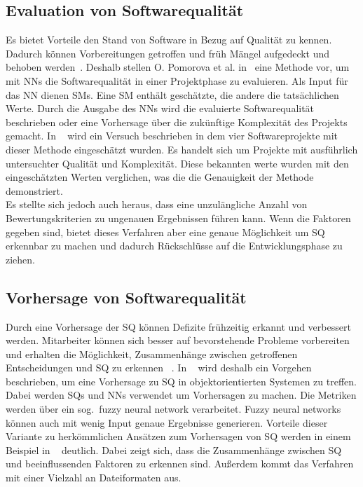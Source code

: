 \subsection{Evaluation von Softwarequalität}
Es bietet Vorteile den Stand von Software in Bezug auf Qualität zu kennen. Dadurch können Vorbereitungen getroffen und früh Mängel aufgedeckt und behoben werden~\cite{Pomorova2013}. Deshalb stellen O. Pomorova et al. in~\cite{Pomorova2013} eine Methode vor, um mit NNs die Softwarequalität in einer Projektphase zu evaluieren. Als Input für das NN dienen SMs. Eine SM enthält geschätzte, die andere die tatsächlichen Werte.
Durch die Ausgabe des NNs wird die evaluierte Softwarequalität beschrieben oder eine Vorhersage über die zukünftige Komplexität des Projekts gemacht. 
In ~\cite{Pomorova2013} wird ein Versuch beschrieben in dem vier Softwareprojekte mit dieser Methode eingeschätzt wurden. Es handelt sich um Projekte mit ausführlich untersuchter Qualität und Komplexität. Diese bekannten werte wurden mit den eingeschätzten Werten verglichen, was die die Genauigkeit der Methode demonstriert. 
\\
Es stellte sich jedoch auch heraus, dass eine unzulängliche Anzahl von Bewertungskriterien zu ungenauen Ergebnissen führen kann.
Wenn die Faktoren gegeben sind, bietet dieses Verfahren aber eine genaue Möglichkeit um SQ erkennbar zu machen und dadurch Rückschlüsse auf die Entwicklungsphase zu ziehen.

\subsection{Vorhersage von Softwarequalität}
Durch eine Vorhersage der SQ können Defizite frühzeitig erkannt und verbessert werden. Mitarbeiter können sich besser auf bevorstehende Probleme vorbereiten und erhalten die Möglichkeit, Zusammenhänge zwischen getrof\-fenen Entscheidungen und SQ zu erkennen ~\cite{Peng2009}. In ~\cite{Peng2009} wird deshalb ein Vorgehen beschrieben, um eine Vorhersage zu SQ in objektorientierten Systemen zu treffen. Dabei werden SQs und NNs verwendet um Vorhersagen zu machen. Die Metriken werden über ein sog.~fuzzy neural network verarbeitet. Fuzzy neural networks können auch mit wenig Input genaue Ergebnisse generieren.
Vorteile dieser Variante zu herkömmlichen Ansätzen zum Vorhersagen von SQ werden in einem Beispiel in ~\cite{Peng2009} deutlich. Dabei zeigt sich, dass die Zusammenhänge zwischen SQ und beeinflussenden Faktoren zu erkennen sind. Außerdem kommt das Verfahren mit einer Vielzahl an Dateiformaten aus.
\\
